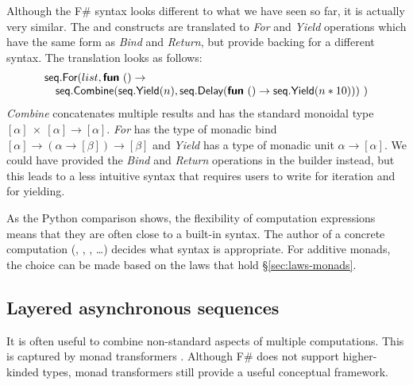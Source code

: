 \documentclass[runningheads,a4paper]{llncs}
\begin{document}
Although the F\# syntax looks different to what we have seen so far, it is actually very
similar. The  and  constructs are translated to \emph{For} and 
\emph{Yield} operations which have the same form as \emph{Bind} and \emph{Return}, but provide
backing for a different syntax. The translation looks as follows:
%
\begin{equation*}
\begin{array}{l}
\textnormal{\sffamily seq}.\textnormal{\sffamily For}(list, \textnormal{\bfseries\sffamily fun}~() \rightarrow \\
\quad \textnormal{\sffamily seq}.\textnormal{\sffamily Combine}(\textnormal{\sffamily seq}.\textnormal{\sffamily Yield}(n), \textnormal{\sffamily seq}.\textnormal{\sffamily Delay}(\textnormal{\bfseries\sffamily fun}~() \rightarrow 
   \textnormal{\sffamily seq}.\textnormal{\sffamily Yield}(n * 10)))~)
\end{array}
\end{equation*}
%
\emph{Combine} concatenates multiple results and has the standard monoidal type
$[\alpha]~\times~[\alpha] \rightarrow [\alpha]$. \emph{For} has the type of monadic 
bind $[\alpha] \rightarrow (\alpha \rightarrow [\beta]) \rightarrow [\beta]$ and \emph{Yield} has a
type of monadic unit $\alpha \rightarrow [\alpha]$. We could have provided the \emph{Bind} 
and \emph{Return} operations in the  builder instead, but this leads to a less intuitive
syntax that requires users to write  for iteration and  for yielding.

As the Python comparison shows, the flexibility of computation expressions means that they
are often close to a built-in syntax. The author of a concrete computation (, 
, , \ldots) decides what syntax is appropriate. For additive monads,
the choice can be made based on the laws that hold \S\ref{sec:laws-monads}.


\subsection{Layered asynchronous sequences}
\label{sec:intro-asyncseq}
 
It is often useful to combine non-standard aspects of multiple computations. 
This is captured by monad transformers \cite{monad-transformers}. Although F\# does not support
higher-kinded types, monad transformers still provide a useful conceptual framework. 
\end{document}
